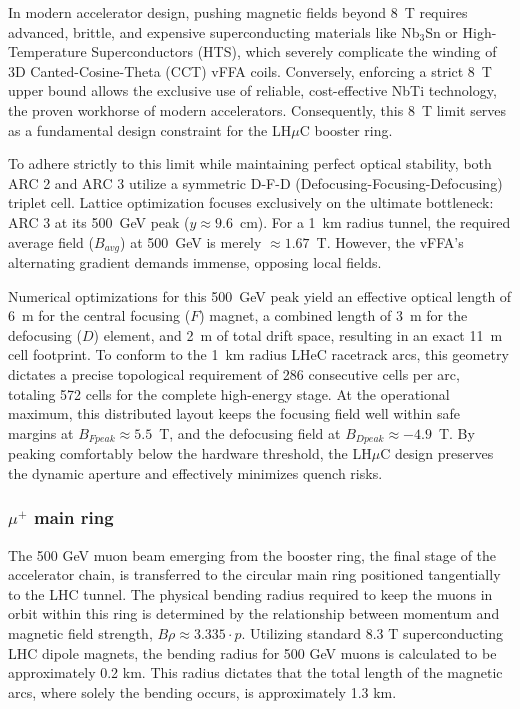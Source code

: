\documentclass[a4paper,11pt]{article}
\newcommand{\lhuc}{LH\ensuremath{\mu}C\xspace}
\begin{document}
In modern accelerator design, pushing magnetic fields beyond 8~T requires advanced, brittle, and expensive superconducting materials like Nb$_3$Sn or High-Temperature Superconductors (HTS), which severely complicate the winding of 3D Canted-Cosine-Theta (CCT) vFFA coils. Conversely, enforcing a strict 8~T upper bound allows the exclusive use of reliable, cost-effective NbTi technology, the proven workhorse of modern accelerators. Consequently, this 8~T limit serves as a fundamental design constraint for the \lhuc booster ring.

To adhere strictly to this limit while maintaining perfect optical stability, both ARC 2 and ARC 3 utilize a symmetric D-F-D (Defocusing-Focusing-Defocusing) triplet cell. Lattice optimization focuses exclusively on the ultimate bottleneck: ARC 3 at its 500~GeV peak ($y \approx 9.6$~cm). For a 1~km radius tunnel, the required average field ($B_{avg}$) at 500~GeV is merely $\approx 1.67$~T. However, the vFFA's alternating gradient demands immense, opposing local fields.

Numerical optimizations for this 500~GeV peak yield an effective optical length of 6~m for the central focusing ($F$) magnet, a combined length of 3~m for the defocusing ($D$) element, and 2~m of total drift space, resulting in an exact 11~m cell footprint. To conform to the 1~km radius LHeC racetrack arcs, this geometry dictates a precise topological requirement of 286 consecutive cells per arc, totaling 572 cells for the complete high-energy stage. At the operational maximum, this distributed layout keeps the focusing field well within safe margins at $B_{Fpeak} \approx 5.5$~T, and the defocusing field at $B_{Dpeak} \approx -4.9$~T. By peaking comfortably below the hardware threshold, the \lhuc design preserves the dynamic aperture and effectively minimizes quench risks.

\subsubsection{\texorpdfstring{$\mu^+$}{Muon} main ring}

The 500 GeV muon beam emerging from the booster ring, the final stage of the accelerator chain, is transferred to the circular main ring positioned tangentially to the LHC tunnel. The physical bending radius required to keep the muons in orbit within this ring is determined by the relationship between momentum and magnetic field strength, $B\rho \approx 3.335 \cdot p$. Utilizing standard 8.3 T superconducting LHC dipole magnets, the bending radius for 500 GeV muons is calculated to be approximately 0.2 km. This radius dictates that the total length of the magnetic arcs, where solely the bending occurs, is approximately 1.3 km.
\end{document}
